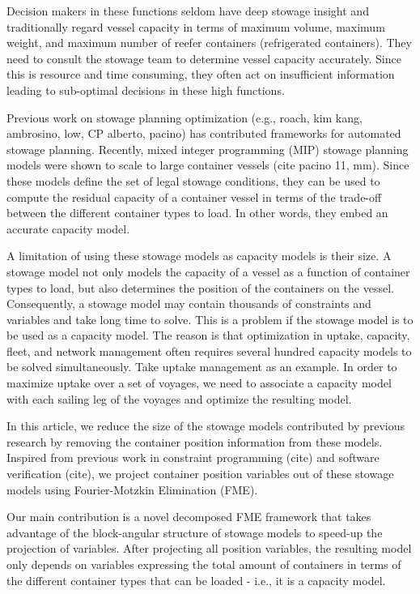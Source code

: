 Decision makers in these functions seldom have deep stowage insight and traditionally regard vessel capacity in terms of maximum volume, maximum weight, and maximum number of reefer containers (refrigerated containers). They need to consult the stowage team to determine vessel capacity accurately. Since this is resource and time consuming, they often act on insufficient information leading to sub-optimal decisions in these high functions.  

Previous work on stowage planning optimization (e.g., roach, kim kang, ambrosino, low, CP alberto, pacino) has contributed frameworks for automated stowage planning. Recently, mixed integer programming (MIP) stowage planning models were shown to scale to large container vessels (cite pacino 11, mm). Since these models define the set of legal stowage conditions, they can be used to compute the residual capacity of a container vessel in terms of the trade-off between the different container types to load. In other words, they embed an accurate capacity model. 

A limitation of using these stowage models as capacity models is their size. A stowage model not only models the capacity of a vessel as a function of container types to load, but also determines the position of the containers on the vessel. Consequently, a stowage model may contain thousands of constraints and variables and take long time to solve. This is a problem if the stowage model is to be used as a capacity model. The reason is that optimization in uptake, capacity, fleet, and network management often requires several hundred capacity models to be solved simultaneously. Take uptake management as an example. In order to maximize uptake over a set of voyages, we need to associate a capacity model with each sailing leg of the voyages and optimize the resulting model.  

In this article, we reduce the size of the stowage models contributed by previous research by removing the container position information from these models. Inspired from previous work in constraint programming (cite) and software verification (cite), we project container position variables out of these stowage models using Fourier-Motzkin Elimination (FME). 

Our main contribution is a novel decomposed FME framework that takes advantage of the block-angular structure of stowage models to speed-up the projection of variables. After projecting all position variables, the resulting model only depends on variables expressing the total amount of containers in terms of the different container types that can be loaded - i.e., it is a capacity model. 

